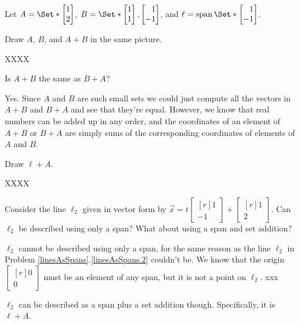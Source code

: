 \documentclass{problemset}
\DeclareMathOperator{\Span}{span}
\newcommand{\mat}[1]{\begin{bmatrix*}[r]#1\end{bmatrix*}}
\begin{document}
	\question
	Let $A=\Set*{\mat{1\\2}}$, $B=\Set*{\mat{1\\1},\mat{1\\-1}}$, 
	and $\ell=\Span\Set*{\mat{1\\-1}}$.
	\begin{parts}
		\item Draw $A$, $B$, and $A+B$ in the same picture.
			\begin{solution}
				XXXX
			\end{solution}
		\item Is $A+B$ the same as $B+A$?
			\begin{solution}
				Yes. Since $A$ and $B$ are such small sets we could just
				compute all the vectors in $A+B$ and $B+A$ and see that they're 
				equal. However, we know that real numbers can be added up in any 
				order, and the coordinates of an element of $A+B$ or $B+A$ are 
				simply sums of the corresponding coordinates of elements of $A$ and $B$. 
			\end{solution}
		\item Draw $\ell+A$.
			\begin{solution}
				XXXX
			\end{solution}
		\item Consider the line $\ell_2$ given in vector form by $\vec x=t\mat{1\\-1}+\mat{1\\2}$.
			Can $\ell_2$ be described using only a span? What about using a span
			and set addition?
			\begin{solution}
				$\ell_2$ cannot be described using only a span, for the same reason 
				as the line $\ell_2$ in Problem \ref{linesAsSpans}.\ref{linesAsSpans.2}
				couldn't be. We know that the origin $\mat{0\\0}$ must be an element
				of any span, but it is not a point on $\ell_2$. xxx

				$\ell_2$ can be described as a span plus a set addition though. 
				Specifically, it is $\ell + A$. 
			\end{solution}
	\end{parts}
\end{document}
